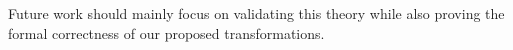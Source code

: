 Future work should mainly focus on validating this theory while also proving the formal correctness of our proposed transformations.



